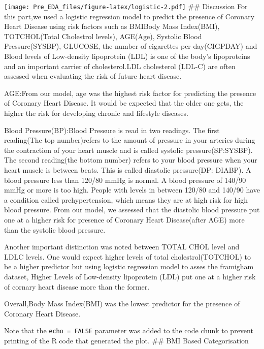 \documentclass[]{article}
\begin{document}
\texttt{[image: Pre\_EDA\_files/figure-latex/logistic-2.pdf]} \#\#
Discussion For this part,we used a logistic regression model to predict
the presence of Coronary Heart Disease using risk factors such as
BMIBody Mass Index(BMI), TOTCHOL(Total Cholestrol levels), AGE(Age),
Systolic Blood Pressure(SYSBP), GLUCOSE, the number of cigarettes per
day(CIGPDAY) and Blood levels of Low-density lipoprotein (LDL) is one of
the body's lipoproteins and an important carrier of cholesterol.LDL
cholesterol (LDL-C) are often assessed when evaluating the risk of
future heart disease.

AGE:From our model, age was the highest risk factor for predicting the
presence of Coronary Heart Disease. It would be expected that the older
one gets, the higher the risk for developing chronic and lifestyle
diseases.

Blood Pressure(BP):Blood Pressure is read in two readings. The first
reading(The top number)refers to the amount of pressure in your arteries
during the contraction of your heart muscle and is called systolic
pressure(SP:SYSBP). The second reading(the bottom number) refers to your
blood pressure when your heart muscle is between beats. This is called
diastolic pressure(DP: DIABP). A blood pressure less than 120/80 mmHg is
normal. A blood pressure of 140/90 mmHg or more is too high. People with
levels in between 120/80 and 140/90 have a condition called
prehypertension, which means they are at high risk for high blood
pressure. From our model, we assessed that the diastolic blood pressure
put one at a higher risk for presence of Coronary Heart Disease(after
AGE) more than the systolic blood pressure.

Another important distinction was noted between TOTAL CHOL level and
LDLC levels. One would expect higher levels of total cholestrol(TOTCHOL)
to be a higher predictor but using logistic regression model to asses
the framigham dataset, Higher Levels of Low-density lipoprotein (LDL)
put one at a higher risk of cornary heart disease more than the former.

Overall,Body Mass Index(BMI) was the lowest predictor for the presence
of Coronary Heart Disease.

Note that the \texttt{echo\ =\ FALSE} parameter was added to the code
chunk to prevent printing of the R code that generated the plot. \#\#
BMI Based Categorisation
\end{document}
